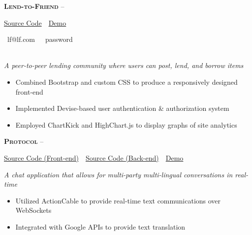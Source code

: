 \documentclass[11pt,letterpaper,english]{article}
\begin{document}
\textbf{\textsc{Lend-to-Friend}} 
--\begin{small}
\href{https://github.com/jdbean/lend-to-friend}{Source Code}~\color{darkgray}{|}~\href{https://pacific-earth-11787.herokuapp.com/}{Demo}
\end{small}
\begin{scriptsize}
\color{gray}
\faUser~lf@lf.com~~\faKey~password
\end{scriptsize}\\
\textit{A peer-to-peer lending community where users can post, lend, and borrow items}
\begin{itemize}
\item Combined Bootstrap and custom CSS to produce a responsively designed front-end
\item Implemented Devise-based user authentication \& authorization system
\item Employed ChartKick and HighChart.js to display graphs of site analytics
\end{itemize}
\smallskip

\textbf{\textsc{Protocol}} 
--\begin{small}
\href{https://github.com/jdbean/protocol-frontend}{Source Code (Front-end)}~\color{darkgray}{|}~\href{https://github.com/jdbean/protocol-backend}{Source Code (Back-end)}~\color{darkgray}{|}~\href{https://www.youtube.com/watch?v=vMI0HT0UjEM}{Demo}\\
\end{small}
\textit{A chat application that allows for multi-party multi-lingual conversations in real-time}
\begin{itemize}
\item Utilized ActionCable to provide real-time text communications over WebSockets
\item Integrated with Google APIs to provide text translation
\end{itemize}
\smallskip
\end{document}
